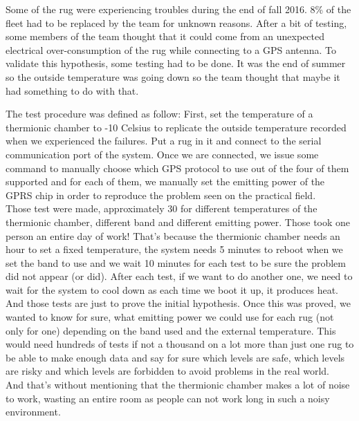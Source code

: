 \documentclass[12pt]{article}
\theoremstyle{definition}
\theoremstyle{definition}
\theoremstyle{remark}
\begin{document}
Some of the \gls{rug} were experiencing troubles during the end of fall 2016. 8\% of the fleet had to be replaced by the team for unknown reasons. After a bit of testing, some members of the team thought that it could come from an unexpected electrical over-consumption of the \gls{rug} while connecting to a GPS antenna. To validate this hypothesis, some testing had to be done. It was the end of summer so the outside temperature was going down so the team thought that maybe it had something to do with that.

The test procedure was defined as follow: First, set the temperature of a thermionic chamber to -10 Celsius to replicate the outside temperature recorded when we experienced the failures. Put a \gls{rug} in it and connect to the serial communication port of the system. Once we are connected, we issue some command to manually choose which GPS protocol to use out of the four of them supported and for each of them, we manually set the emitting power of the GPRS chip in order to reproduce the problem seen on the practical field.\\

Those test were made, approximately 30 for different temperatures of the thermionic chamber, different band and different emitting power. Those took one person an entire day of work! That's because the thermionic chamber needs an hour to set a fixed temperature, the system needs 5 minutes to reboot when we set the band to use and we wait 10 minutes for each test to be sure the problem did not appear (or did). After each test, if we want to do another one, we need to wait for the system to cool down as each time we boot it up, it produces heat.\\

And those tests are just to prove the initial hypothesis. Once this was proved, we wanted to know for sure, what emitting power we could use for each \gls{rug} (not only for one) depending on the band used and the external temperature. This would need hundreds of tests if not a thousand on a lot more than just one \gls{rug} to be able to make enough data and say for sure which levels are safe, which levels are risky and which levels are forbidden to avoid problems in the real world.\\

And that's without mentioning that the thermionic chamber makes a lot of noise to work, wasting an entire room as people can not work long in such a noisy environment.\\
\end{document}
